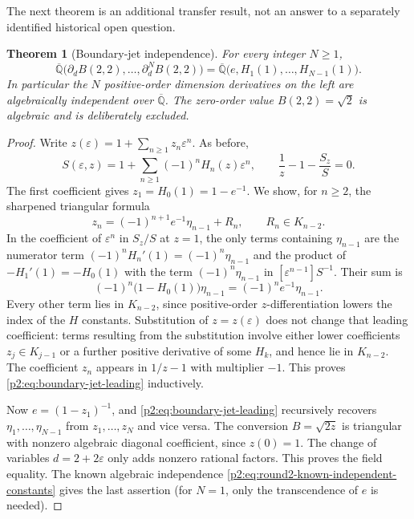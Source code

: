 \documentclass[11pt,a4paper]{article}
\newtheorem{theorem}{Theorem}[section]
\theoremstyle{definition}
\theoremstyle{remark}
\numberwithin{equation}{section}
\begin{document}
The next theorem is an additional transfer result, not an answer to a
separately identified historical open question.

\begin{theorem}[Boundary-jet independence]\label{p2:thm:boundary-jets-round2}
For every integer $N\geq1$,
\[
 \overline{\mathbb Q}\bigl(
      \partial_dB(2,2),\ldots,\partial_d^N B(2,2)\bigr)
 =\overline{\mathbb Q}\bigl(e,H_1(1),\ldots,H_{N-1}(1)\bigr).
\]
In particular the $N$ positive-order dimension derivatives on the
left are algebraically independent over $\overline{\mathbb Q}$.
The zero-order value $B(2,2)=\sqrt2$ is algebraic and is deliberately
excluded.
\end{theorem}
\begin{proof}
Write $z(\varepsilon)=1+\sum_{n\geq1}z_n\varepsilon^n$. As before,
\[
 S(\varepsilon,z)=1+\sum_{n\geq1}(-1)^nH_n(z)\varepsilon^n,
 \qquad \frac1z-1-\frac{S_z}{S}=0.
\]
The first coefficient gives $z_1=H_0(1)=1-e^{-1}$. We show, for
$n\geq2$, the sharpened triangular formula
\begin{equation}\label{p2:eq:boundary-jet-leading}
 z_n=(-1)^{n+1}e^{-1}\eta_{n-1}+R_n,
 \qquad R_n\in K_{n-2}.
\end{equation}
In the coefficient of $\varepsilon^n$ in $S_z/S$ at $z=1$, the
only terms containing $\eta_{n-1}$ are the numerator term
$(-1)^nH_n'(1)=(-1)^n\eta_{n-1}$ and the product of
$-H_1'(1)=-H_0(1)$ with the term
$(-1)^n\eta_{n-1}$ in $[\varepsilon^{n-1}]S^{-1}$.
Their sum is
\[
 (-1)^n\bigl(1-H_0(1)\bigr)\eta_{n-1}
       =(-1)^ne^{-1}\eta_{n-1}.
\]
Every other term lies in $K_{n-2}$, since positive-order
$z$-differentiation lowers the index of the $H$ constants.
Substitution of $z=z(\varepsilon)$ does not change that leading
coefficient: terms resulting from the substitution involve either
lower coefficients $z_j\in K_{j-1}$ or a further positive derivative
of some $H_k$, and hence lie in $K_{n-2}$. The coefficient $z_n$
appears in $1/z-1$ with multiplier $-1$. This proves
\eqref{p2:eq:boundary-jet-leading} inductively.

Now $e=(1-z_1)^{-1}$, and
\eqref{p2:eq:boundary-jet-leading} recursively recovers
$\eta_1,\ldots,\eta_{N-1}$ from $z_1,\ldots,z_N$ and vice versa.
The conversion $B=\sqrt{2z}$ is triangular with nonzero algebraic
diagonal coefficient, since $z(0)=1$. The change of variables
$d=2+2\varepsilon$ only adds nonzero rational factors. This proves
the field equality. The known algebraic independence
\eqref{p2:eq:round2-known-independent-constants} gives the last assertion
(for $N=1$, only the transcendence of $e$ is needed).
\end{proof}
\end{document}
